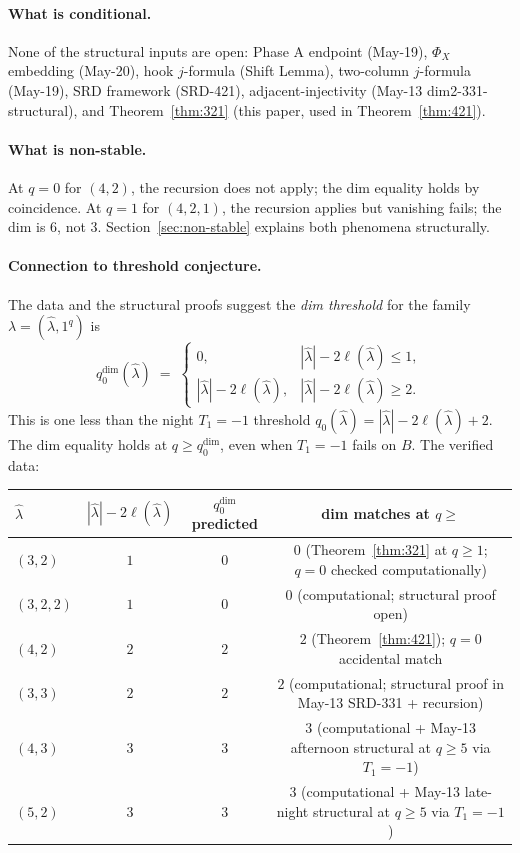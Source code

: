 \documentclass[11pt]{article}
\theoremstyle{definition}
\begin{document}
\paragraph{What is conditional.}
None of the structural inputs are open: Phase A endpoint (May-19),
$\Phi_X$ embedding (May-20), hook $j$-formula (Shift Lemma),
two-column $j$-formula (May-19), SRD framework (SRD-421),
adjacent-injectivity (May-13 dim2-331-structural), and
Theorem~\ref{thm:321} (this paper, used in
Theorem~\ref{thm:421}).

\paragraph{What is non-stable.}
At $q = 0$ for $(4, 2)$, the recursion does not apply; the dim equality
holds by coincidence. At $q = 1$ for $(4, 2, 1)$, the recursion
applies but vanishing fails; the dim is $6$, not $3$. Section~\ref{sec:non-stable}
explains both phenomena structurally.

\paragraph{Connection to threshold conjecture.}
The data and the structural proofs suggest the
\emph{dim threshold} for the family
$\lambda = (\widehat\lambda, 1^q)$ is
\[
   q_0^{\dim}(\widehat\lambda) \;=\;
   \begin{cases}
      0, & |\widehat\lambda| - 2\ell(\widehat\lambda) \le 1,\\
      |\widehat\lambda| - 2\ell(\widehat\lambda), & |\widehat\lambda| - 2\ell(\widehat\lambda) \ge 2.
   \end{cases}
\]
This is one less than the night $T_1 = -1$ threshold
$q_0(\widehat\lambda) = |\widehat\lambda| - 2\ell(\widehat\lambda) + 2$.
The dim equality holds at $q \ge q_0^{\dim}$, even when $T_1 = -1$
fails on $B$. The verified data:

\begin{center}
\renewcommand{\arraystretch}{1.15}
\begin{tabular}{lccc}
\toprule
$\widehat\lambda$ & $|\widehat\lambda| - 2\ell(\widehat\lambda)$
   & $q_0^{\dim}$ predicted & dim matches at $q \ge$ \\
\midrule
$(3, 2)$    & $1$ & $0$ & $0$ (Theorem~\ref{thm:321} at $q \ge 1$;
            $q = 0$ checked computationally) \\
$(3, 2, 2)$ & $1$ & $0$ & $0$ (computational; structural proof open) \\
$(4, 2)$    & $2$ & $2$ & $2$ (Theorem~\ref{thm:421}); $q = 0$
            accidental match \\
$(3, 3)$    & $2$ & $2$ & $2$ (computational; structural proof
            in May-13 SRD-331 + recursion) \\
$(4, 3)$    & $3$ & $3$ & $3$ (computational + May-13 afternoon
            structural at $q \ge 5$ via $T_1 = -1$) \\
$(5, 2)$    & $3$ & $3$ & $3$ (computational + May-13 late-night
            structural at $q \ge 5$ via $T_1 = -1$) \\
\bottomrule
\end{tabular}
\end{center}
\end{document}
